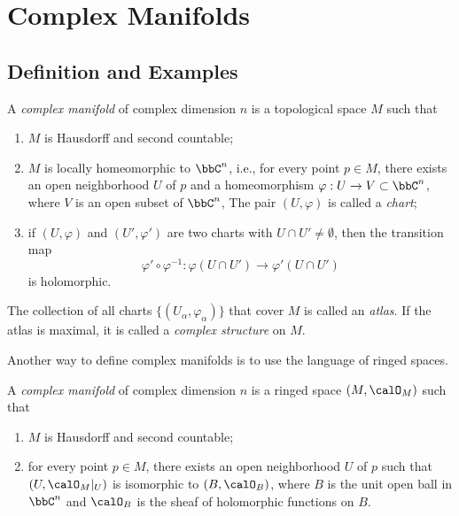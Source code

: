 \section{Complex Manifolds}

\subsection{Definition and Examples}

    \begin{definition}\label{def:complex_manifold}
        A \emph{complex manifold} of complex dimension \(n\) is a topological space \(M\) such that
        \begin{enumerate}
            \item \(M\) is Hausdorff and second countable;
            \item \(M\) is locally homeomorphic to \(\bbC^n\), i.e., for every point \(p\in M\), there exists an open neighborhood \(U\) of \(p\) and a homeomorphism \(\varphi: U\to V\subset \bbC^n\), where \(V\) is an open subset of \(\bbC^n\),
                The pair \((U,\varphi)\) is called a \emph{chart};
            \item if \((U,\varphi)\) and \((U',\varphi')\) are two charts with \(U\cap U'\neq \emptyset\), then the transition map
                \[
                    \varphi'\circ \varphi^{-1}: \varphi(U\cap U')\to \varphi'(U\cap U')
                \]
                is holomorphic.
        \end{enumerate}
        The collection of all charts \(\{(U_\alpha,\varphi_\alpha)\}\) that cover \(M\) is called an \emph{atlas}.
        If the atlas is maximal, it is called a \emph{complex structure} on \(M\).
    \end{definition}

    Another way to define complex manifolds is to use the language of ringed spaces.

    \begin{definition}\label{def:complex_manifold_as_ringed_space}
        A \emph{complex manifold} of complex dimension \(n\) is a ringed space \((M,\calO_M)\) such that
        \begin{enumerate}
            \item \(M\) is Hausdorff and second countable;
            \item for every point \(p\in M\), there exists an open neighborhood \(U\) of \(p\) such that \((U,\calO_M|_U)\) is isomorphic to \((B,\calO_B)\), where \(B\) is the unit open ball in \(\bbC^n\) and \(\calO_B\) is the sheaf of holomorphic functions on \(B\).
        \end{enumerate}
    \end{definition}

